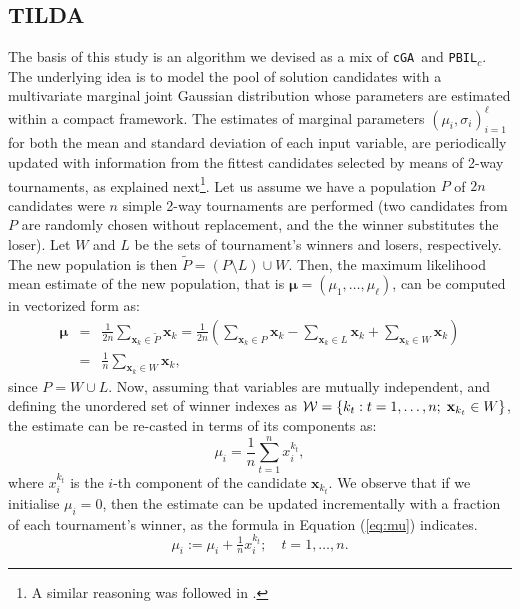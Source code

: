 \documentclass{sig-alternate}
\newcommand{\bx}{{\mathbf x}}
\newcommand{\bmu}{{\boldsymbol \mu}}
\newcommand{\PBILc}{\texttt{PBIL$_c$}}
\newcommand{\cGA}{\texttt{cGA}}
\begin{document}
\subsection{TILDA}
\label{sec:tilda}
The basis of this study is an algorithm we devised as a mix of \cGA~and \PBILc. The underlying idea is to model the pool of solution candidates with a multivariate marginal joint Gaussian distribution whose parameters are estimated within a compact framework. The estimates of marginal parameters $(\mu_i, \sigma_i)_{i=1}^{\ell}$ for both the mean and standard deviation of each input variable, are periodically updated with information from the fittest candidates selected by means of 2-way tournaments, as explained next\footnote{A similar reasoning was followed in \cite[Appendix A]{Mininno08}.}. Let us assume we have a population $P$ of $2n$ candidates were $n$ simple 2-way tournaments are performed (two candidates from $P$ are randomly chosen without replacement, and the the winner substitutes the loser). Let $W$ and $L$ be the sets of tournament's winners and losers, respectively. The new population is then $\widetilde{P} = (P \setminus L) \cup W$. Then, the maximum likelihood mean estimate of the new population, that is $\bmu=(\mu_1,\ldots,\mu_\ell)$, can be computed in vectorized form as:
\begin{eqnarray*}
\boldsymbol \mu &=& \frac{1}{2n}\sum_{\bx_k \in \widetilde{P}}{\bx_k} = \frac{1}{2n} \left( \sum_{\bx_k \in P}{\bx_k} - \sum_{\bx_k \in L}{\bx_k} + \sum_{\bx_k \in W}{\bx_k}\right) \\ &=& \frac{1}{n} \sum_{\bx_k \in W}{\bx_k},
\end{eqnarray*}
since $P = W \cup L$. Now, assuming that variables are mutually independent, and defining the unordered set of winner indexes as ${\cal W}=\{k_t: t=1,\ldots,n;\; \bx_{k_t} \in W\}$, the estimate can be re-casted in terms of its components as: 
\begin{equation}
\mu_i=\frac{1}{n}\sum_{t=1}^n x_i^{k_t}, \nonumber
\end{equation}
where $x^{k_t}_i$ is the $i$-th component of the candidate $\bx_{k_t}$. We observe that if we initialise $\mu_i=0$, then the estimate can be updated incrementally with a fraction of each tournament's winner, as the formula in Equation (\ref{eq:mu}) indicates. 
\begin{equation}
\mu_i:=\mu_i+\tfrac{1}{n} x_i^{k_t}; \quad t=1,\ldots,n. \label{eq:mu}
\end{equation}
\end{document}
